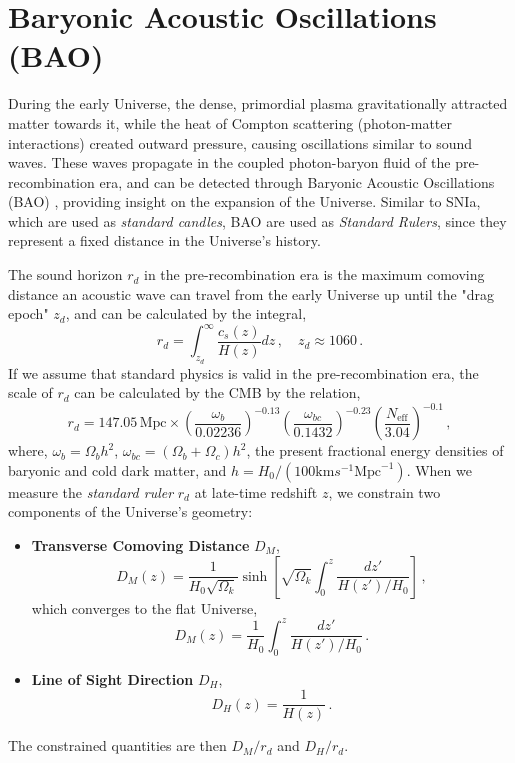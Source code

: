 \documentclass{book}
\begin{document}
	
	
	\section{Baryonic Acoustic Oscillations (BAO)}
	During the early Universe, the dense, primordial plasma gravitationally attracted matter towards it, while the heat of Compton scattering (photon-matter interactions) created outward pressure, causing oscillations similar to sound waves. These waves propagate in the coupled photon-baryon fluid of the pre-recombination era, and can be detected through Baryonic Acoustic Oscillations (BAO) \cite{Favale_2023, DESI:2025zgx, Alam_2017}, providing insight on the expansion of the Universe. Similar to SNIa, which are used as \textit{standard candles}, BAO are used as \textit{Standard Rulers}, since they represent a fixed distance in the Universe's history.
	
	The sound horizon $r_d$ in the pre-recombination era is the maximum comoving distance an acoustic wave can travel from the early Universe up until the "drag epoch" $z_d$, and can be calculated by the integral,
	\begin{equation}
		r_d=\int_{z_d}^{\infty}\frac{c_s(z)}{H(z)}dz \, , \quad z_d \approx 1060 \, .
	\end{equation}
	If we assume that standard physics is valid in the pre-recombination era, the scale of $r_d$ can be calculated by the CMB by the relation,
	\begin{equation}
		r_{d}=147.05\,\text{Mpc}\times \left(\frac{\omega_{b}}{0.02236}\right)^{-0.13}\left(\frac{\omega_{bc}}{0.1432}\right)^{-0.23}\left(\frac{N_{\text{eff}}}{3.04}\right)^{-0.1} \, ,
	\end{equation}
	where, $\omega_b=\Omega_b h^2$, $\omega_{bc}=(\Omega_b+\Omega_c)h^2$, the present fractional energy densities of baryonic and cold dark matter, and $h=H_0 /(100\text{km}s^{-1}\text{Mpc}^{-1})$. When we measure the \textit{standard ruler} $r_d$ at late-time redshift $z$, we constrain two components of the Universe's geometry:
	\begin{itemize}
		\item \textbf{Transverse Comoving Distance} $D_M$,
		\begin{equation}
			D_M(z)=\frac{1}{H_0 \sqrt{\Omega_k}}\sinh \left[ \sqrt{\Omega_k} \int_{0}^{z} \frac{dz'}{H(z')/H_0} \right] \, ,
		\end{equation} 
		which converges to the flat Universe,
		\begin{equation}
			D_M(z)=\frac{1}{H_0}\int_{0}^{z} \frac{dz'}{H(z')/H_0} \, .
		\end{equation}
		\item \textbf{Line of Sight Direction} $D_H$,
		\begin{equation}
			D_H(z)=\frac{1}{H(z)} \, .
		\end{equation}
	\end{itemize}
	The constrained quantities are then $D_M/r_d$ and $D_H/r_d$.
	
\end{document}
